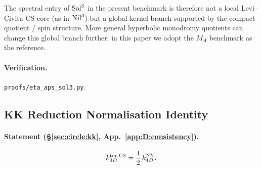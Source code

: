 The spectral entry of $\mathrm{Sol}^3$ in the present benchmark is therefore not
a local Levi--Civita CS core (as in $\mathrm{Nil}^3$) but a global kernel branch
supported by the compact quotient / spin structure.  More general
hyperbolic monodromy quotients can change this global branch further; in
this paper we adopt the $M_A$ benchmark as the reference.

\paragraph{Verification.}
\texttt{proofs/eta\_aps\_sol3.py}.

\subsection{KK Reduction Normalisation Identity}
\label{app:E:E11}

\paragraph{Statement (\S\ref{sec:circle:kk}, App.~\ref{app:D:consistency}).}
\begin{equation}
  k_{3D}^{\mathrm{tor\text{-}CS}} = \frac{1}{2}\,k_{4D}^{\mathrm{NY}}.
\end{equation}

